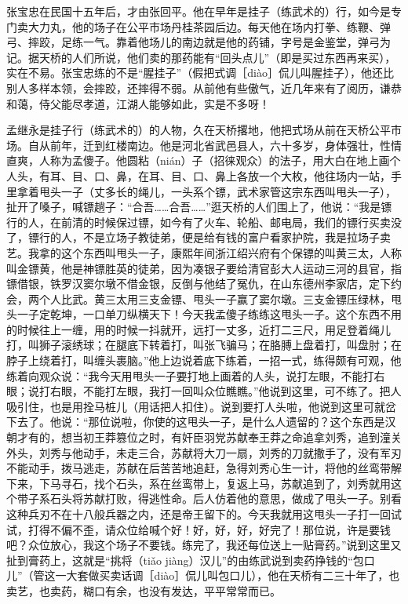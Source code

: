 \documentclass[12pt,UTF8]{ctexbook}
\begin{document}
张宝忠在民国十五年后，才由张回平。他在早年是挂子（练武术的）行，如今是专门卖大力丸，他的场子在公平市场丹桂茶园后边。每天他在场内打拳、练鞭、弹弓、摔跤，足练一气。靠着他场儿的南边就是他的药铺，字号是金鉴堂，弹弓为记。据天桥的人们所说，他们卖的那药能有“回头点儿”（即是买过东西再来买），实在不易。张宝忠练的不是“腥挂子”（假把式调［diào］侃儿叫腥挂子），他还比别人多样本领，会摔跤，还摔得不弱。从前他有些傲气，近几年来有了阅历，谦恭和蔼，侍父能尽孝道，江湖人能够如此，实是不多呀！

孟继永是挂子行（练武术的）的人物，久在天桥撂地，他把式场从前在天桥公平市场。自从前年，迁到红楼南边。他是河北省武邑县人，六十多岁，身体强壮，性情直爽，人称为孟傻子。他圆粘（nián）子（招徕观众）的法子，用大白在地上画个人头，有耳、目、口、鼻，在耳、目、口、鼻上各放一个大枚，他往场内一站，手里拿着甩头一子（丈多长的绳儿，一头系个镖，武术家管这宗东西叫甩头一子），扯开了嗓子，喊镖趟子：“合吾……合吾……”逛天桥的人们围上了，他说：“我是镖行的人，在前清的时候保过镖，如今有了火车、轮船、邮电局，我们的镖行买卖没了，镖行的人，不是立场子教徒弟，便是给有钱的富户看家护院，我是拉场子卖艺。我拿的这个东西叫甩头一子，康熙年间浙江绍兴府有个保镖的叫黄三太，人称叫金镖黄，他是神镖胜英的徒弟，因为凑银子要给清官彭大人运动三河的县官，指镖借银，铁罗汉窦尔墩不借金银，反倒与他结了冤仇，在山东德州李家店，定下约会，两个人比武。黄三太用三支金镖、甩头一子赢了窦尔墩。三支金镖压绿林，甩头一子定乾坤，一口单刀纵横天下！今天我孟傻子练练这甩头一子。这个东西不用的时候往上一缠，用的时候一抖就开，远打一丈多，近打二三尺，用足登着绳儿打，叫狮子滚绣球；在腿底下转着打，叫张飞骗马；在胳膊上盘着打，叫盘肘；在脖子上绕着打，叫缠头裹脑。”他上边说着底下练着，一招一式，练得颇有可观，他练着向观众说：“我今天用甩头一子要打地上画着的人头，说打左眼，不能打右眼；说打右眼，不能打左眼，我打一回叫众位瞧瞧。”他说到这里，可不练了。把人吸引住，也是用拴马桩儿（用话把人扣住）。说到要打人头啦，他说到这里可就岔下去了。他说：“那位说啦，你使的这甩头一子，是什么人遗留的？这个东西是汉朝才有的，想当初王莽篡位之时，有奸臣羽党苏献奉王莽之命追拿刘秀，追到潼关外头，刘秀与他动手，未走三合，苏献将大刀一扇，刘秀的刀就撒手了，没有军刃不能动手，拨马逃走，苏献在后苦苦地追赶，急得刘秀心生一计，将他的丝鸾带解下来，下马寻石，找个石头，系在丝鸾带上，复返上马，苏献追到了，刘秀就用这个带子系石头将苏献打败，得逃性命。后人仿着他的意思，做成了甩头一子。别看这种兵刃不在十八般兵器之内，还是帝王留下的。今天我就用这甩头一子打一回试试，打得不偏不歪，请众位给喊个好！好，好，好，好完了！那位说，许是要钱吧？众位放心，我这个场子不要钱。练完了，我还每位送上一贴膏药。”说到这里又扯到膏药上，这就是“挑将（tiǎo jiàng）汉儿”的由练武说到卖药挣钱的“包口儿”（管这一大套做买卖话调［diào］侃儿叫包口儿），他在天桥有二三十年了，也卖艺，也卖药，糊口有余，也没有发达，平平常常而已。
\end{document}
